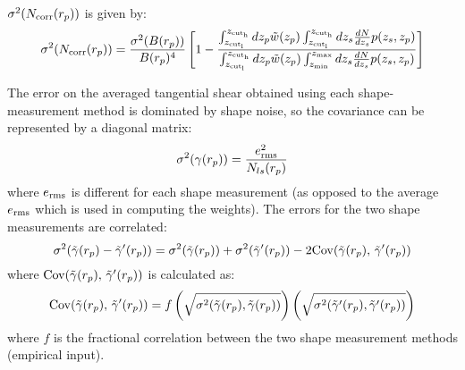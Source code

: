 \documentclass[onecolumn,amsmath,aps,fleqn, superscriptaddress]{revtex4}
\begin{document}
$\sigma^2(N_{\rm corr}(r_p))$ is given by:
\begin{equation}
\sigma^2(N_{\rm corr}(r_p)) = \frac{\sigma^2(B(r_p))}{B(r_p)^4}\left[1-\frac{\int_{z_{\rm cut_l}}^{z_{\rm cut_h}} dz_p \tilde{w}(z_p) \int_{z_{\rm cut_l}}^{z_{\rm cut_h}} dz_s\frac{dN}{dz_s} p(z_s, z_p)}{\int_{z_{\rm cut_l}}^{z_{\rm cut_h}} dz_p  \tilde{w}(z_p) \int_{z_{\rm min}}^{z_{\rm max}} dz_s\frac{dN}{dz_s} p(z_s, z_p)}\right]
\label{Ncorr_err}
\end{equation}

The error on the averaged tangential shear obtained using each shape-measurement method is dominated by shape noise, so the covariance can be represented by a diagonal matrix:
\begin{equation}
\sigma^2(\gamma(r_p)) = \frac{e_{\rm rms}^2}{N_{ls}(r_p)}
\label{diag_corr}
\end{equation} 
where $e_{\rm rms}$ is different for each shape measurement (as opposed to the average $e_{\rm rms}$ which is used in computing the weights). The errors for the two shape measurements are correlated:
\begin{equation}
\sigma^2(\tilde{\gamma}(r_p) - \tilde{\gamma}^\prime(r_p)) = \sigma^2(\tilde{\gamma}(r_p)) + \sigma^2(\tilde{\gamma}^\prime(r_p)) - 2 {\rm Cov}( \tilde{\gamma}(r_p), \, \tilde{\gamma}^\prime(r_p))
\label{comb_gammat}
\end{equation}
where ${\rm Cov}( \tilde{\gamma}(r_p), \, \tilde{\gamma}^\prime(r_p))$ is calculated as:
\begin{equation}
{\rm Cov}( \tilde{\gamma}(r_p), \, \tilde{\gamma}^\prime(r_p)) = f \left(\sqrt{\sigma^2(\tilde{\gamma}(r_p), \tilde{\gamma}(r_p))}\right)\left(\sqrt{\sigma^2(\tilde{\gamma}^\prime(r_p), \tilde{\gamma}^\prime(r_p))}\right)
\label{Cov}
\end{equation}
where $f$ is the fractional correlation between the two shape measurement methods (empirical input).
\end{document}

